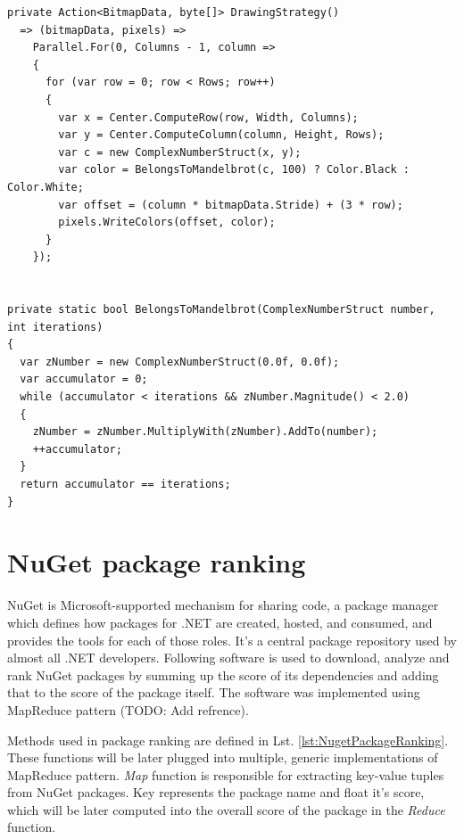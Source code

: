 \begin{lstlisting}[style=sharpcstyle, caption={Parallel Mandelbrot algorithm using value types}, label={lst:ParStructMandelbrot}]
private Action<BitmapData, byte[]> DrawingStrategy()
  => (bitmapData, pixels) =>
    Parallel.For(0, Columns - 1, column =>
    {
      for (var row = 0; row < Rows; row++)
      {
        var x = Center.ComputeRow(row, Width, Columns);
        var y = Center.ComputeColumn(column, Height, Rows);
        var c = new ComplexNumberStruct(x, y);
        var color = BelongsToMandelbrot(c, 100) ? Color.Black : Color.White;
        var offset = (column * bitmapData.Stride) + (3 * row);
        pixels.WriteColors(offset, color);
      }
    });


private static bool BelongsToMandelbrot(ComplexNumberStruct number, int iterations)
{
  var zNumber = new ComplexNumberStruct(0.0f, 0.0f);
  var accumulator = 0;
  while (accumulator < iterations && zNumber.Magnitude() < 2.0)
  {
    zNumber = zNumber.MultiplyWith(zNumber).AddTo(number);
    ++accumulator;
  }
  return accumulator == iterations;
}

\end{lstlisting}

\clearpage
\section{NuGet package ranking}
\label{sec: NuGetImp}
NuGet is Microsoft-supported mechanism for sharing code, a package manager which defines how packages for .NET are created, hosted, and consumed, and provides the tools for each of those roles. It's a central package repository used by almost all .NET developers. Following software is used to download, analyze and rank NuGet packages by summing up the score of its dependencies and adding that to the score of the package itself. The software was implemented using MapReduce pattern (TODO: Add refrence).

Methods used in package ranking are defined in Lst. \ref{lst:NugetPackageRanking}. These functions will be later plugged into multiple, generic implementations of MapReduce pattern. \emph{Map} function is responsible for extracting key-value tuples from NuGet packages. Key represents the package name and float it's score, which will be later computed into the overall score of the package in the \emph{Reduce} function.

